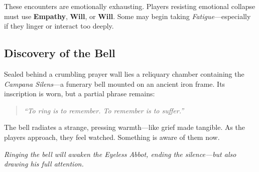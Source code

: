 \documentclass[nodeprecatedcode,bg=print]{dndbook/dndbook}
\begin{document}
These encounters are emotionally exhausting. Players resisting emotional collapse must use \textbf{Empathy}, \textbf{Will}, or \textbf{Will}. Some may begin taking \emph{Fatigue}—especially if they linger or interact too deeply.

\subsection{Discovery of the Bell}

Sealed behind a crumbling prayer wall lies a reliquary chamber containing the \emph{Campana Silens}—a funerary bell mounted on an ancient iron frame. Its inscription is worn, but a partial phrase remains:

\begin{quote}
\textit{“To ring is to remember. To remember is to suffer.”}
\end{quote}

The bell radiates a strange, pressing warmth—like grief made tangible. As the players approach, they feel watched. Something is aware of them now.

\emph{Ringing the bell will awaken the Eyeless Abbot, ending the silence—but also drawing his full attention.}
\end{document}

